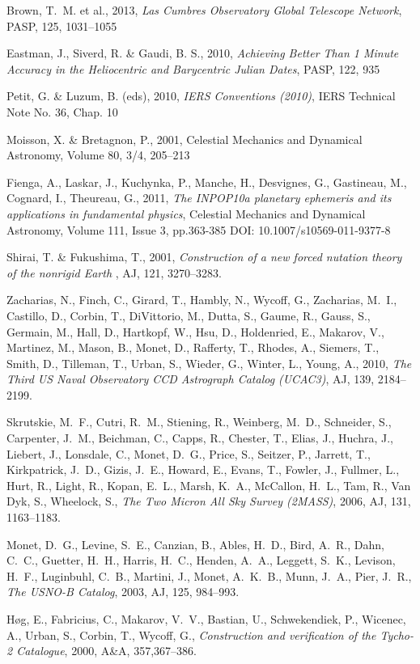 \documentclass[twoside,11pt,nolof]{starlink}
\begin{document}
\begin{thebibliography}{}
 Brown, T.~M. et al., 2013, \textit{Las Cumbres
Observatory Global Telescope Network}, PASP, 125, 1031--1055

 Eastman, J., Siverd, R. \& Gaudi, B. S., 2010, \textit{Achieving Better Than 1 Minute Accuracy in the Heliocentric and Barycentric
Julian Dates}, PASP, 122, 935

 Petit, G. \& Luzum, B. (eds), 2010, \textit{IERS Conventions
(2010)}, IERS Technical Note No. 36, Chap. 10

 Moisson, X. \& Bretagnon, P., 2001, Celestial Mechanics and
Dynamical Astronomy, Volume 80, 3/4, 205--213

 Fienga, A., Laskar, J., Kuchynka, P., Manche, H., Desvignes,
G., Gastineau, M., Cognard, I., Theureau, G., 2011, \textit{The INPOP10a
planetary ephemeris and its applications in fundamental physics}, 
Celestial Mechanics and Dynamical Astronomy, Volume 111, Issue 3, pp.363-385
DOI: 10.1007/s10569-011-9377-8

 Shirai, T. \& Fukushima, T., 2001, \textit{Construction of a
new forced nutation theory of the nonrigid Earth }, AJ, 121, 3270--3283. 

 Zacharias, N., Finch, C., Girard, T., Hambly, N.,  Wycoff, G.,
Zacharias, M.~I., Castillo, D., Corbin, T.,  DiVittorio, M., Dutta, S., Gaume,
R., Gauss, S.,  Germain, M., Hall, D., Hartkopf, W., Hsu, D.,  Holdenried, E.,
Makarov, V., Martinez, M., Mason, B.,  Monet, D., Rafferty, T., Rhodes, A.,
Siemers, T.,  Smith, D., Tilleman, T., Urban, S., Wieder, G.,  Winter, L.,
Young, A., 2010, \textit{The Third US Naval Observatory CCD Astrograph Catalog
(UCAC3)}, AJ, 139, 2184--2199.

 Skrutskie, M.~F., Cutri, R.~M., Stiening, R.,  Weinberg, M.~D.,
Schneider, S., Carpenter, J.~M.,  Beichman, C., Capps, R., Chester, T., Elias,
J.,  Huchra, J., Liebert, J., Lonsdale, C., Monet, D.~G.,  Price, S., Seitzer,
P., Jarrett, T., Kirkpatrick, J.~D.,  Gizis, J.~E., Howard, E., Evans, T.,
Fowler, J.,  Fullmer, L., Hurt, R., Light, R., Kopan, E.~L.,  Marsh, K.~A.,
McCallon, H.~L., Tam, R., Van Dyk, S.,  Wheelock, S., \textit{The Two Micron All
Sky Survey (2MASS)}, 2006, AJ, 131, 1163--1183.

 Monet, D.~G., Levine, S.~E., Canzian, B., Ables, H.~D., 
Bird, A.~R., Dahn, C.~C., Guetter, H.~H., Harris, H.~C.,  Henden, A.~A.,
Leggett, S.~K., Levison, H.~F.,  Luginbuhl, C.~B., Martini, J., Monet,
A.~K.~B.,  Munn, J.~A., Pier, J.~R., \textit{The USNO-B Catalog}, 2003, AJ,
125, 984--993.

 H{\o}g, E., Fabricius, C., Makarov, V.~V., Bastian, U., 
Schwekendiek, P., Wicenec, A., Urban, S., Corbin, T.,  Wycoff, G.,
\textit{Construction and verification of the Tycho-2 Catalogue}, 2000, A\&A,
357,367--386.

\end{thebibliography}
\end{document}
